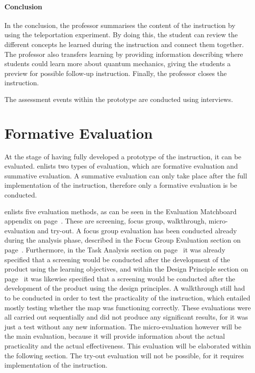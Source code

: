 \documentclass[11pt,twoside]{report} %
\begin{document}
\subsubsection{Conclusion}

In the conclusion, the professor summarises the content of the instruction by using the teleportation experiment. By doing this, the student can review the different concepts he learned during the instruction and connect them together. The professor also transfers learning by providing information describing where students could learn more about quantum mechanics, giving the students a preview for possible follow-up instruction. Finally, the professor closes the instruction.

The assessment events within the prototype are conducted using interviews.


\chapter{Formative Evaluation}
\thispagestyle{fancy}

At the stage of having fully developed a prototype of the instruction, it can be evaluated.  enlists two types of evaluation, which are formative evaluation and summative evaluation. A summative evaluation can only take place after the full implementation of the instruction, therefore only a formative evaluation is be conducted.

 enlists five evaluation methods, as can be seen in the Evaluation Matchboard appendix on page~\pageref{app:evamatchboard}. These are screening, focus group, walkthrough, micro-evaluation and try-out. A focus group evaluation has been conducted already during the analysis phase, described in the Focus Group Evaluation section on page~\pageref{ch:focusgroup}. Furthermore, in the Task Analysis section on page~\pageref{subch:testspecifications} it was already specified that a screening would be conducted after the development of the product using the learning objectives, and within the Design Principle section on page~\pageref{ch:designprinciples} it was likewise specified that a screening would be conducted after the development of the product using the design principles. A walkthrough still had to be conducted in order to test the practicality of the instruction, which entailed mostly testing whether the map was functioning correctly. These evaluations were all carried out sequentially and did not produce any significant results, for it was just a test without any new information. The micro-evaluation however will be the main evaluation, because it will provide information about the actual practicality and the actual effectiveness. This evaluation will be elaborated within the following section. The try-out evaluation will not be possible, for it requires implementation of the instruction.
\end{document}
